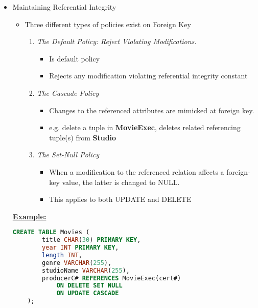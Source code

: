 \documentclass[12pt]{article}
\begin{document}
\begin{enumerate}[1.]
\begin{enumerate}[a)]
        \begin{itemize}
            \item Maintaining Referential Integrity
            \begin{itemize}
                \item Three different types of policies exist on Foreign Key
                \begin{enumerate}[1.]
                    \item \textit{The Default Policy:} \textit{Reject Violating Modifications.}
                    \begin{itemize}
                        \item Is default policy
                        \item Rejects any modification violating referential integrity constant
                    \end{itemize}
                    \item \textit{The Cascade Policy}
                    \begin{itemize}
                        \item Changes to the referenced attributes are mimicked at foreign key.
                        \item e.g. delete a tuple in \textbf{MovieExec}, deletes related
                        referencing tuple(s) from \textbf{Studio}
                    \end{itemize}
                    \item \textit{The Set-Null Policy}
                    \begin{itemize}
                        \item When a modification to the referenced relation affects a foreign-key
                        value, the latter is changed to NULL.
                        \item This applies to both UPDATE and DELETE
                    \end{itemize}
                \end{enumerate}
            \end{itemize}

            \bigskip

            \underline{\textbf{Example:}}

            \bigskip

    \begin{lstlisting}[language=SQL]
    CREATE TABLE Movies (
        title CHAR(30) PRIMARY KEY,
        year INT PRIMARY KEY,
        length INT,
        genre VARCHAR(255),
        studioName VARCHAR(255),
        producerC# REFERENCES MovieExec(cert#)
            ON DELETE SET NULL
            ON UPDATE CASCADE
    );
    \end{lstlisting}
        \end{itemize}


\end{enumerate}
\end{enumerate}
\end{document}
